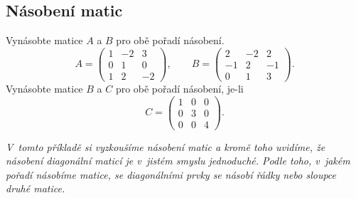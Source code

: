 \subsection{Násobení matic}
Vynásobte matice $A$ a $B$ pro obě pořadí násobení.
\begin{equation*}
A=  \begin{pmatrix}
  1 & -2 & 3\\
  0 & 1 & 0\\
  1 & 2 & -2
\end{pmatrix},\qquad
B=  \begin{pmatrix}
  2 & -2 & 2\\
  -1 & 2 & -1\\
  0 & 1 & 3
\end{pmatrix}.
\end{equation*}
Vynásobte matice $B$ a $C$ pro obě pořadí násobení, je-li 
\begin{equation*}
C=  \begin{pmatrix}
  1 & 0 & 0\\
  0 & 3 & 0\\
  0 & 0 & 4
\end{pmatrix}.
\end{equation*}

\textit{V tomto příkladě si vyzkoušíme násobení matic a kromě toho uvidíme, že násobení diagonální maticí je v jistém smyslu jednoduché. Podle toho, v jakém pořadí násobíme matice, se diagonálními prvky se násobí řádky nebo sloupce druhé matice.}


